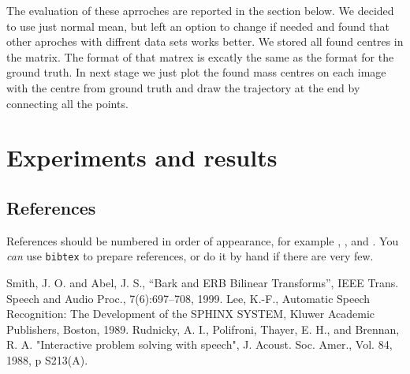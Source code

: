 \documentclass[10pt,a4paper,oneclumn]{article}
\begin{document}
The evaluation of these aprroches are reported in the section below. We decided to use just normal mean, but left an option to change if needed and found that other aproches with diffrent data sets works better. We stored all found centres in the matrix. The format of that matrex is excatly the same as the format for the ground truth. In next stage we just plot the found mass centres on each image with the centre from ground truth and draw the trajectory at the end by connecting all the points.

\section{Experiments and results}



\subsection{References}

References should be numbered in order of appearance, 
for example \cite{ES1}, \cite{ES2}, and \cite{ES3}. 
You \emph{can} use \texttt{bibtex} to prepare references,
or do it by hand if there are very few.

%

\begin{thebibliography}{10}
 Smith, J. O. and Abel, J. S., 
``Bark and {ERB} Bilinear Transforms'', 
IEEE Trans. Speech and Audio Proc., 7(6):697--708, 1999.  
 Lee, K.-F., Automatic Speech Recognition: 
The Development of the 
SPHINX SYSTEM, Kluwer Academic Publishers, Boston, 1989.
 Rudnicky, A. I., Polifroni, Thayer, E. H.,
 and Brennan, R. A.  
"Interactive problem solving with speech", J. Acoust. Soc. Amer., 
Vol. 84, 1988, p S213(A).
\end{thebibliography}
\end{document}
